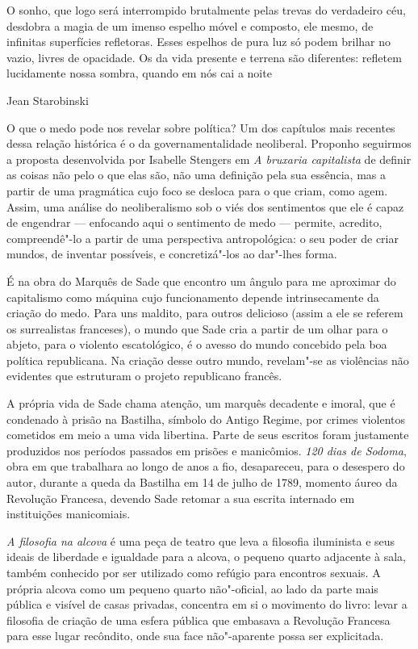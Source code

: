 \epigraph{O sonho, que logo será interrompido brutalmente pelas trevas do
verdadeiro céu, desdobra a magia de um imenso espelho móvel e composto,
ele mesmo, de infinitas superfícies refletoras. Esses espelhos de pura
luz só podem brilhar no vazio, livres de opacidade. Os da vida presente
e terrena são diferentes: refletem lucidamente nossa sombra, quando em
nós cai a noite}{Jean Starobinski}

O que o medo pode nos revelar sobre política? Um dos capítulos mais
recentes dessa relação histórica é o da governamentalidade neoliberal.
Proponho seguirmos a proposta desenvolvida por Isabelle Stengers em
\emph{A bruxaria capitalista} de definir as coisas não pelo o que elas
são, não uma definição pela sua essência, mas a partir de uma pragmática
cujo foco se desloca para o que criam, como agem. Assim, uma análise do
neoliberalismo sob o viés dos sentimentos que ele é capaz de engendrar ---
enfocando aqui o sentimento de medo --- permite, acredito, compreendê"-lo a
partir de uma perspectiva antropológica: o seu poder de criar mundos, de
inventar possíveis, e concretizá"-los ao dar"-lhes forma.

\asterisc

É na obra do Marquês de Sade que encontro um ângulo para me aproximar
do capitalismo como máquina cujo funcionamento depende intrinsecamente
da criação do medo. Para uns maldito, para outros delicioso (assim a ele
se referem os surrealistas franceses), o mundo que Sade cria a partir de
um olhar para o abjeto, para o violento escatológico, é o avesso do
mundo concebido pela boa política republicana. Na criação desse outro
mundo, revelam"-se as violências não evidentes que estruturam o projeto
republicano francês.

A própria vida de Sade chama atenção, um marquês decadente e imoral, que
é condenado à prisão na Bastilha, símbolo do Antigo Regime, por crimes
violentos cometidos em meio a uma vida libertina. Parte de seus escritos
foram justamente produzidos nos períodos passados em prisões e
manicômios. \emph{120 dias de Sodoma}, obra em que trabalhara ao longo
de anos a fio, desapareceu, para o desespero do autor, durante a queda
da Bastilha em 14 de julho de 1789, momento áureo da Revolução Francesa,
devendo Sade retomar a sua escrita internado em instituições
manicomiais.

\emph{A filosofia na alcova} é uma peça de teatro que leva a filosofia
iluminista e seus ideais de liberdade e igualdade para a alcova, o
pequeno quarto adjacente à sala, também conhecido por ser utilizado como
refúgio para encontros sexuais. A própria alcova como um pequeno quarto
não"-oficial, ao lado da parte mais pública e visível de casas privadas,
concentra em si o movimento do livro: levar a filosofia de criação de
uma esfera pública que embasava a Revolução Francesa para esse lugar
recôndito, onde sua face não"-aparente possa ser explicitada.

